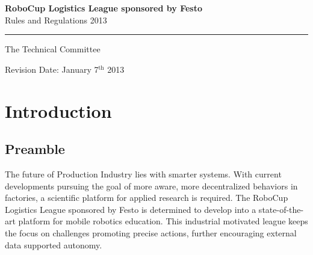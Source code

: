 \documentclass[12pt,twoside]{article}
\begin{document}


\begin{titlepage}
  \vspace*{5cm}
  \begin{center}
    \begin{LARGE}
      
      {\bf RoboCup Logistics League sponsored by Festo}\\[2ex]
      {\Large Rules and Regulations 2013}\\[4ex]
    \end{LARGE}
    \hrule
    
    {\LARGE\vspace*{4ex}}
    \begin{Large}
      The Technical Committee\\[6ex]
    \end{Large}
    \vfill
    Revision Date: January 7$^\mathrm{th}$ 2013
  \end{center}
  
\end{titlepage}
\thispagestyle{empty}
\pagebreak
\clearpage

\setcounter{page}{1}
\tableofcontents
\newpage
\cleardoublepage

\setcounter{page}{1}

\section{Introduction} \label{sec:intro}

\subsection*{Preamble} \label{sec:preamble}

The future of Production Industry lies with smarter systems.  With
current developments pursuing the goal of more aware, more
decentralized behaviors in factories, a scientific platform for
applied research is required.  The RoboCup Logistics League sponsored
by Festo is determined to develop into a state-of-the-art platform for
mobile robotics education. This industrial motivated league keeps the
focus on challenges promoting precise actions, further encouraging
external data supported autonomy.
\end{document}

